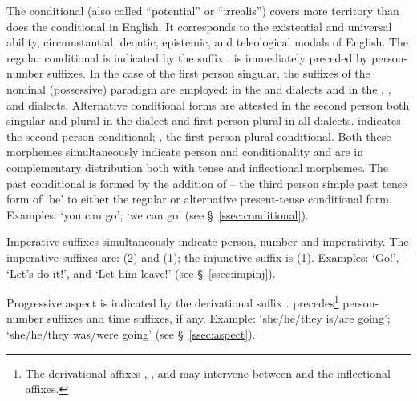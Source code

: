 The conditional (also called ``potential'' or ``irrealis'') covers more territory than does the conditional in English. It corresponds to the existential and universal ability, circumstantial, deontic, epistemic, and teleological modals of English. The regular conditional is indicated by the suffix .  is immediately preceded by person-number suffixes. In the case of the first person singular, the suffixes of the nominal (possessive) paradigm are employed:  in the \AMV{} and \LT{} dialects and \phono{-:} in the \ACH{}, \CH{}, and \SP{} dialects. Alternative conditional forms are attested in the second person both singular and plural in the \AMV{} dialect and first person plural in all dialects.  indicates the second person conditional; , the first person plural conditional. Both these morphemes simultaneously indicate person and conditionality and are in complementary distribution both with tense and inflectional morphemes. The past conditional is formed by the addition of  -- the third person simple past tense form of  `be' to either the regular or alternative present-tense conditional form. Examples:  `you can go';  `we can go' (see \S~\ref{ssec:conditional}).

Imperative suffixes simultaneously indicate person, number and imperativity. The imperative suffixes are:  (2) and  (1); the injunctive suffix is  (1). Examples:  `Go!',  `Let's do it!', and  `Let him leave!' (see \S~\ref{ssec:impinj}).

Progressive aspect is indicated by the derivational suffix .  precedes\footnote{The derivational affixes , , and  may intervene between  and the inflectional affixes.} person-number suffixes and time suffixes, if any. Example:  `she/he/they is/are going';  `she/he/they was/were going' (see \S~\ref{ssec:aspect}).

